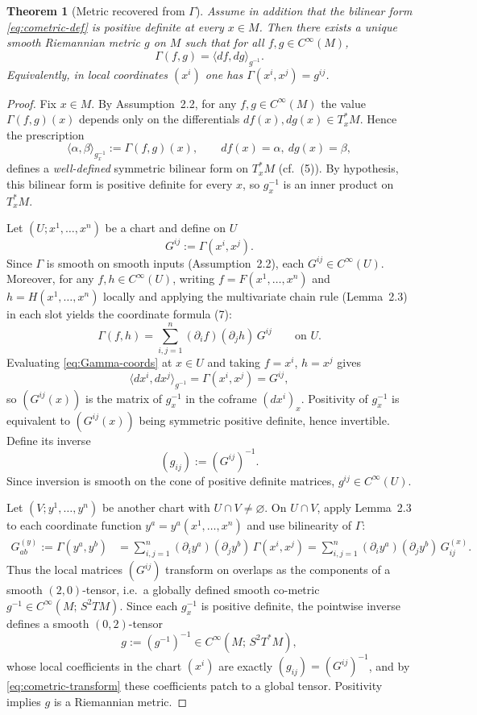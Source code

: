 \documentclass[11pt]{amsart}
\newtheorem{theorem}{Theorem}[section]
\theoremstyle{definition}
\theoremstyle{remark}
\begin{document}
\begin{theorem}[Metric recovered from $\Gamma$]\label{thm:recover-metric-from-Gamma}
Assume in addition that the bilinear form \eqref{eq:cometric-def} is positive definite at every
$x\in M$.  Then there exists a unique smooth Riemannian metric $g$ on $M$ such that for all
$f,g\in C^\infty(M)$,
\begin{equation}\label{eq:Gamma-metric}
\Gamma(f,g)=\langle df,dg\rangle_{g^{-1}}.
\end{equation}
Equivalently, in local coordinates $(x^i)$ one has $\Gamma(x^i,x^j)=g^{ij}$.
\end{theorem}
\begin{proof}
Fix $x\in M$. By Assumption~2.2, for any $f,g\in C^\infty(M)$ the value $\Gamma(f,g)(x)$ depends
only on the differentials $df(x),dg(x)\in T_x^*M$. Hence the prescription
\[
\langle \alpha,\beta\rangle_{g^{-1}_x}:=\Gamma(f,g)(x),
\qquad df(x)=\alpha,\ dg(x)=\beta,
\]
defines a \emph{well-defined} symmetric bilinear form on $T_x^*M$ (cf.\ (5)).
By hypothesis, this bilinear form is positive definite for every $x$, so $g^{-1}_x$ is an inner product
on $T_x^*M$.

Let $(U;x^1,\dots,x^n)$ be a chart and define on $U$
\[
G^{ij}:=\Gamma(x^i,x^j).
\]
Since $\Gamma$ is smooth on smooth inputs (Assumption~2.2), each $G^{ij}\in C^\infty(U)$.
Moreover, for any $f,h\in C^\infty(U)$, writing $f=F(x^1,\dots,x^n)$ and $h=H(x^1,\dots,x^n)$
locally and applying the multivariate chain rule (Lemma~2.3) in each slot yields the coordinate formula (7):
\begin{equation}\label{eq:Gamma-coords}
\Gamma(f,h)=\sum_{i,j=1}^n (\partial_i f)(\partial_j h)\,G^{ij}
\qquad\text{on }U.
\end{equation}
Evaluating \eqref{eq:Gamma-coords} at $x\in U$ and taking $f=x^i$, $h=x^j$ gives
\[
\langle dx^i,dx^j\rangle_{g^{-1}} = \Gamma(x^i,x^j)=G^{ij},
\]
so $(G^{ij}(x))$ is the matrix of $g^{-1}_x$ in the coframe $(dx^i)_x$. Positivity of $g^{-1}_x$
is equivalent to $(G^{ij}(x))$ being symmetric positive definite, hence invertible. Define its inverse
\[
(g_{ij}) := (G^{ij})^{-1}.
\]
Since inversion is smooth on the cone of positive definite matrices, $g^{ij}\in C^\infty(U)$.

Let $(V;y^1,\dots,y^n)$ be another chart with $U\cap V\neq\varnothing$. On $U\cap V$, apply
Lemma~2.3 to each coordinate function $y^a=y^a(x^1,\dots,x^n)$ and use bilinearity of $\Gamma$:
\begin{align}
G^{(y)}_{ab}
:=\Gamma(y^a,y^b)
&=\sum_{i,j=1}^n (\partial_i y^a)(\partial_j y^b)\,\Gamma(x^i,x^j)
=\sum_{i,j=1}^n (\partial_i y^a)(\partial_j y^b)\,G^{(x)}_{ij}.
\label{eq:cometric-transform}
\end{align}
Thus the local matrices $(G^{ij})$ transform on overlaps as the components of a smooth $(2,0)$-tensor,
i.e.\ a globally defined smooth co-metric $g^{-1}\in C^\infty(M;\,S^2TM)$. Since each $g^{-1}_x$ is
positive definite, the pointwise inverse defines a smooth $(0,2)$-tensor
\[
g := (g^{-1})^{-1}\in C^\infty(M;\,S^2T^*M),
\]
whose local coefficients in the chart $(x^i)$ are exactly $(g_{ij})=(G^{ij})^{-1}$, and by
\eqref{eq:cometric-transform} these coefficients patch to a global tensor. Positivity implies $g$ is a
Riemannian metric.


\end{proof}
\end{document}
